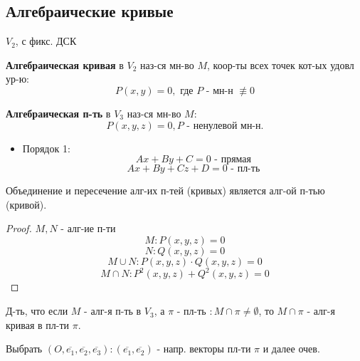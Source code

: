 \subsection{Алгебраические кривые}
$V_2$, с фикс. ДСК \\

\begin{definition}
\textbf{Алгебраическая кривая} в $V_2$ наз-ся мн-во $M$, коор-ты всех точек кот-ых удовл ур-ю:
\[
P(x, y) = 0, \text{ где } P \text{ - мн-н } \not\equiv 0
\]
\end{definition}
\begin{definition}
\textbf{Алгебраическая п-ть} в $V_3$ наз-ся мн-во $M$:
\[
  P(x, y, z) = 0, P \text{ - ненулевой мн-н.}
\]
\end{definition}
\begin{example}
\begin{itemize}
  \item Порядок 1:
    \[
    Ax + By + C = 0 \text{ - прямая}
    \]
    \[
    Ax + By + Cz + D = 0 \text{ - пл-ть}
    \]
\end{itemize}
\end{example}
\begin{statement}
Объединение и пересечение алг-их п-тей (кривых) является алг-ой п-тью (кривой).
\end{statement}
\begin{proof}
$M, N$ - алг-ие п-ти \\
\[
M \colon P(x, y, z) = 0
\]
\[
N \colon Q(x, y, z) = 0
\]
\[
M \cup N \colon P(x, y, z) \cdot Q(x, y, z) = 0
\]
\[
M \cap N \colon P^{2}(x, y, z) + Q^{2}(x, y, z) = 0
\]
\end{proof}
\begin{task}
Д-ть, что если $M$ - алг-я п-ть в $V_3$, а $\pi$ - пл-ть $\colon M \cap \pi \neq \emptyset$, то $M \cap \pi$ - алг-я кривая в пл-ти $\pi$.
\end{task}
\begin{solution}
Выбрать $(O, \overline{e_1}, \overline{e_2}, \overline{e_3}) \colon (\overline{e_1}, \overline{e_2}) \text{ - напр. векторы пл-ти $\pi$}$ и далее очев.
\end{solution}
